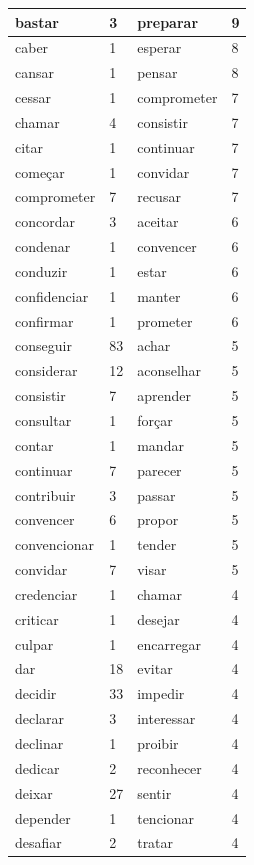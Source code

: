 \documentclass[output=paper,colorlinks,citecolor=brown]{langscibook}
\begin{document}
\begin{longtable}{ p{3cm} | p{1cm} | p{3cm} | p{1cm} }
		bastar & 3 & preparar & 9\\\hline
		caber & 1 & esperar & 8\\\hline
		cansar & 1 & pensar & 8\\\hline
		cessar & 1 & comprometer & 7\\\hline
		chamar & 4 & consistir & 7\\\hline
		citar & 1 & continuar & 7\\\hline
		começar & 1 & convidar & 7\\\hline
		comprometer & 7 & recusar & 7\\\hline
		concordar & 3 & aceitar & 6\\\hline
		condenar & 1 & convencer & 6\\\hline
		conduzir & 1 & estar & 6\\\hline
		confidenciar & 1 & manter & 6\\\hline
		confirmar & 1 & prometer & 6\\\hline
		conseguir & 83 & achar & 5\\\hline
		considerar & 12 & aconselhar & 5\\\hline
		consistir & 7 & aprender & 5\\\hline
		consultar & 1 & forçar & 5\\\hline
		contar & 1 & mandar & 5\\\hline
		continuar & 7 & parecer & 5\\\hline
		contribuir & 3 & passar & 5\\\hline
		convencer & 6 & propor & 5\\\hline
		convencionar & 1 & tender & 5\\\hline
		convidar & 7 & visar & 5\\\hline
		credenciar & 1 & chamar & 4\\\hline
		criticar & 1 & desejar & 4\\\hline
		culpar & 1 & encarregar & 4\\\hline
		dar & 18 & evitar & 4\\\hline
		decidir & 33 & impedir & 4\\\hline
		declarar & 3 & interessar & 4\\\hline
		declinar & 1 & proibir & 4\\\hline
		dedicar & 2 & reconhecer & 4\\\hline
		deixar & 27 & sentir & 4\\\hline
		depender & 1 & tencionar & 4\\\hline
		desafiar & 2 & tratar & 4\\\hline

\end{longtable}
\end{document}
